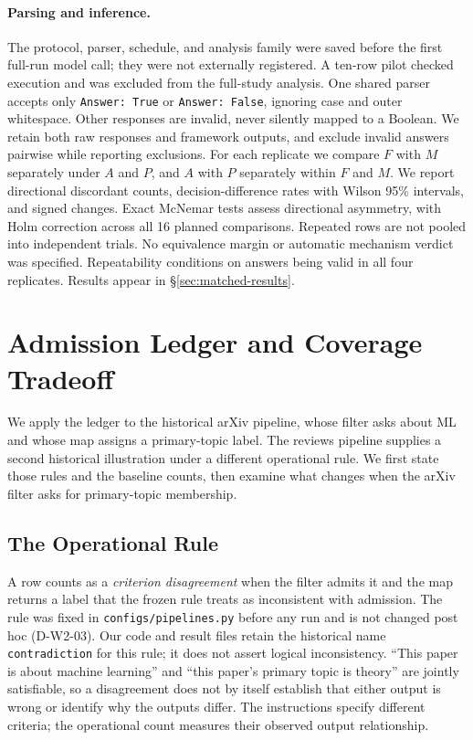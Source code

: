 \documentclass[11pt]{article}
\begin{document}
\paragraph{Parsing and inference.}
The protocol, parser, schedule, and analysis family were saved before the
first full-run model call; they were not externally registered. A ten-row
pilot checked execution and was excluded from the full-study analysis. One
shared parser accepts only \texttt{Answer: True} or \texttt{Answer: False},
ignoring case and outer whitespace. Other responses are invalid, never
silently mapped to a Boolean. We retain both raw responses and framework
outputs, and exclude invalid answers pairwise while reporting exclusions.
For each replicate we compare $F$ with $M$ separately under $A$ and $P$,
and $A$ with $P$ separately within $F$ and $M$. We report directional
discordant counts, decision-difference rates with Wilson 95\% intervals,
and signed changes. Exact McNemar tests assess directional asymmetry, with
Holm correction across all 16 planned comparisons. Repeated rows are not
pooled into independent trials. No equivalence margin or automatic
mechanism verdict was specified. Repeatability conditions on answers being
valid in all four replicates. Results appear in
\S\ref{sec:matched-results}.


\section{Admission Ledger and Coverage Tradeoff}
\label{sec:rq3}
\label{sec:interpretation}
We apply the ledger to the historical arXiv pipeline, whose filter asks about
ML and whose map assigns a primary-topic label. The reviews pipeline supplies
a second historical illustration under a different operational rule. We first
state those rules and the baseline counts, then examine what changes when the
arXiv filter asks for primary-topic membership.

\subsection{The Operational Rule}

A row counts as a \emph{criterion disagreement} when the filter admits it and
the map returns a label that the frozen rule treats as inconsistent with
admission. The rule was fixed in \texttt{configs/pipelines.py} before any run
and is not changed post hoc (D-W2-03). Our code and result files retain the
historical name \texttt{contradiction} for this rule; it does not assert
logical inconsistency. ``This paper is about machine learning'' and ``this
paper's primary topic is theory'' are jointly satisfiable, so a disagreement
does not by itself establish that either output is wrong or identify
why the outputs differ. The instructions specify different criteria;
the operational count measures their observed output relationship.
\end{document}
